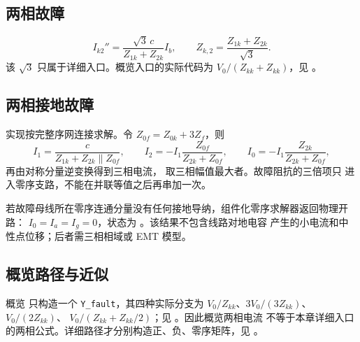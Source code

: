 \subsection{两相故障}
\begin{equation}
I_{k2}''=\frac{\sqrt3\,c}{Z_{1k}+Z_{2k}}I_b,\qquad Z_{k,2}=\frac{Z_{1k}+Z_{2k}}{\sqrt3}.
\end{equation}
该 $\sqrt3$ 只属于详细入口。概览入口的实际代码为
$V_0/(Z_{kk}+Z_{kk})$，见 。

\subsection{两相接地故障}
实现按完整序网连接求解。令 $Z_{0f}=Z_{0k}+3Z_f$，则
\begin{equation}
I_1=\frac{c}{Z_{1k}+Z_{2k}\parallel Z_{0f}},\qquad
I_2=-I_1\frac{Z_{0f}}{Z_{2k}+Z_{0f}},\qquad
I_0=-I_1\frac{Z_{2k}}{Z_{2k}+Z_{0f}},
\end{equation}
再由对称分量逆变换得到三相电流， 取三相幅值最大者。故障阻抗的三倍项只
进入零序支路，不能在并联等值之后再串加一次。

若故障母线所在零序连通分量没有任何接地导纳，组件化零序求解器返回物理开路：
$I_0=I_a=I_g=0$，状态为 。该结果不包含线路对地电容
产生的小电流和中性点位移；后者需三相相域或 EMT 模型。

\subsection{概览路径与近似}
概览  只构造一个 \texttt{Y\_fault}，其四种实际分支为
$V_0/Z_{kk}$、$3V_0/(3Z_{kk})$、$V_0/(2Z_{kk})$、
$V_0/(Z_{kk}+Z_{kk}/2)$；见 。因此概览两相电流
不等于本章详细入口的两相公式。详细路径才分别构造正、负、零序矩阵，见
。
